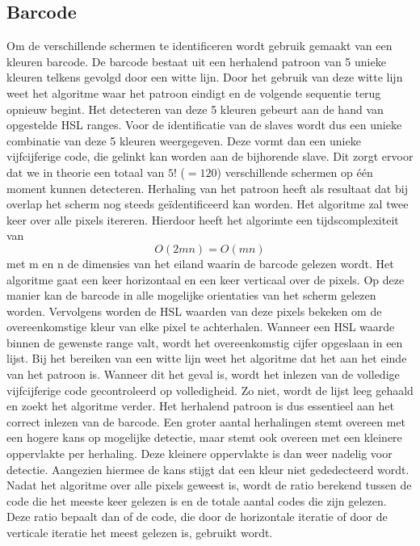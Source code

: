  \subsection{Barcode} \label{barcode}
Om de verschillende schermen te identificeren wordt gebruik gemaakt van een kleuren barcode. De barcode bestaat uit een herhalend patroon van 5 unieke kleuren telkens gevolgd door een witte lijn. Door het gebruik van deze witte lijn weet het algoritme waar het patroon eindigt en de volgende sequentie terug opnieuw begint. Het detecteren van deze 5 kleuren gebeurt aan de hand van opgestelde HSL ranges. Voor de identificatie van de slaves wordt dus een unieke combinatie van deze 5 kleuren weergegeven. Deze vormt dan een unieke vijfcijferige code, die gelinkt kan worden aan de bijhorende slave. Dit zorgt ervoor dat we in theorie een totaal van $5!$ ($=120$) verschillende schermen op één moment kunnen detecteren. Herhaling van het patroon heeft als resultaat dat bij overlap het scherm nog steeds geïdentificeerd kan worden. Het algoritme zal twee keer over alle pixels itereren. Hierdoor heeft het algorimte een tijdscomplexiteit van
\[O(2mn)=O(mn)\]
met m en n de dimensies van het eiland waarin de barcode gelezen wordt. Het algoritme gaat een keer horizontaal en een keer verticaal over de pixels. Op deze manier kan de barcode in alle mogelijke orientaties van het scherm gelezen worden. Vervolgens worden de HSL waarden van deze pixels bekeken om de overeenkomstige kleur van elke pixel te achterhalen. Wanneer een HSL waarde binnen de gewenste range valt, wordt het overeenkomstig cijfer opgeslaan in een lijst. Bij het bereiken van een witte lijn weet het algoritme dat het aan het einde van het patroon is. Wanneer dit het geval is, wordt het inlezen van de volledige vijfcijferige code gecontroleerd op volledigheid. Zo niet, wordt de lijst leeg gehaald en zoekt het algoritme verder. Het herhalend patroon is dus essentieel aan het correct inlezen van de barcode. Een groter aantal herhalingen stemt overeen met een hogere kans op mogelijke detectie, maar stemt ook overeen met een kleinere oppervlakte per herhaling. Deze kleinere oppervlakte is dan weer nadelig voor detectie. Aangezien hiermee de kans stijgt dat een kleur niet gededecteerd wordt. Nadat het algoritme over alle pixels geweest is, wordt de ratio berekend tussen de code die het meeste keer gelezen is en de totale aantal codes die zijn gelezen. Deze ratio bepaalt dan of de code, die door de horizontale iteratie of door de verticale iteratie het meest gelezen is, gebruikt wordt.

